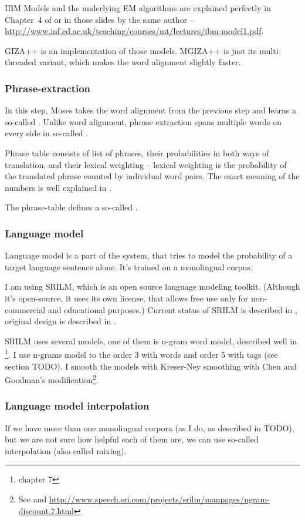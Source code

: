 IBM Models and the underlying EM algorithms are explained perfectly in Chapter~4 of \cite{koehn2010statistical} or in those slides by the same author -- \url{http://www.inf.ed.ac.uk/teaching/courses/mt/lectures/ibm-model1.pdf}.

GIZA++ is an implementation of those models. MGIZA++ is just its mu\-lti-thre\-aded variant, which makes the word alignment slightly faster.

\subsubsection{Phrase-extraction}
In this step, Moses takes the word alignment from the previous step and learns a so-called .
Unlike word alignment, phrase extraction spans multiple words on every side in so-called .

Phrase table consists of list of phrases, their probabilities in both ways of translation, and their lexical weighting -- lexical weighting is the probability of the translated phrase counted by individual word pairs. The exact meaning of the numbers is well explained in \cite{koehn2003}.

The phrase-table defines a so-called . 

\subsubsection{Language model}
Language model is a part of the system, that tries to model the probability of a target language sentence alone. It's trained on a monolingual corpus.

I am using SRILM, which is an open source language modeling toolkit. (Although it's open-source, it uses its own license, that allows free use only for non-commercial and educational purposes.) Current status of SRILM is described in \cite{srilm}, original design is described in \cite{srilm_old}. 

SRILM uses several models, one of them is n-gram word model, described well in \cite{koehn2010statistical}\footnote{chapter 7}. I use n-grams model to the order 3 with words and order 5 with tags (see section TODO). I smooth the models with Kreser-Ney smoothing with Chen and Goodman's modification\footnote{See \cite{chen} and \url{http://www.speech.sri.com/projects/srilm/manpages/ngram-discount.7.html}}. 


\subsubsection{Language model interpolation}
\label{interpol}
If we have more than one monolingual corpora (as I do, as described in TODO), but we are not sure how helpful each of them are, we can use so-called 
interpolation (also called mixing).


